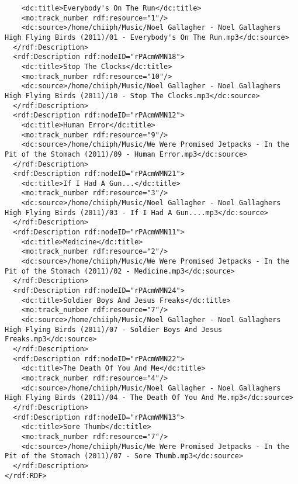 \documentclass[a4paper,oneside]{report}
\begin{document}
\begin{lstlisting}
    <dc:title>Everybody's On The Run</dc:title>
    <mo:track_number rdf:resource="1"/>
    <dc:source>/home/chiiph/Music/Noel Gallagher - Noel Gallaghers High Flying Birds (2011)/01 - Everybody's On The Run.mp3</dc:source>
  </rdf:Description>
  <rdf:Description rdf:nodeID="rPAcmWMN18">
    <dc:title>Stop The Clocks</dc:title>
    <mo:track_number rdf:resource="10"/>
    <dc:source>/home/chiiph/Music/Noel Gallagher - Noel Gallaghers High Flying Birds (2011)/10 - Stop The Clocks.mp3</dc:source>
  </rdf:Description>
  <rdf:Description rdf:nodeID="rPAcmWMN12">
    <dc:title>Human Error</dc:title>
    <mo:track_number rdf:resource="9"/>
    <dc:source>/home/chiiph/Music/We Were Promised Jetpacks - In the Pit of the Stomach (2011)/09 - Human Error.mp3</dc:source>
  </rdf:Description>
  <rdf:Description rdf:nodeID="rPAcmWMN21">
    <dc:title>If I Had A Gun...</dc:title>
    <mo:track_number rdf:resource="3"/>
    <dc:source>/home/chiiph/Music/Noel Gallagher - Noel Gallaghers High Flying Birds (2011)/03 - If I Had A Gun....mp3</dc:source>
  </rdf:Description>
  <rdf:Description rdf:nodeID="rPAcmWMN11">
    <dc:title>Medicine</dc:title>
    <mo:track_number rdf:resource="2"/>
    <dc:source>/home/chiiph/Music/We Were Promised Jetpacks - In the Pit of the Stomach (2011)/02 - Medicine.mp3</dc:source>
  </rdf:Description>
  <rdf:Description rdf:nodeID="rPAcmWMN24">
    <dc:title>Soldier Boys And Jesus Freaks</dc:title>
    <mo:track_number rdf:resource="7"/>
    <dc:source>/home/chiiph/Music/Noel Gallagher - Noel Gallaghers High Flying Birds (2011)/07 - Soldier Boys And Jesus Freaks.mp3</dc:source>
  </rdf:Description>
  <rdf:Description rdf:nodeID="rPAcmWMN22">
    <dc:title>The Death Of You And Me</dc:title>
    <mo:track_number rdf:resource="4"/>
    <dc:source>/home/chiiph/Music/Noel Gallagher - Noel Gallaghers High Flying Birds (2011)/04 - The Death Of You And Me.mp3</dc:source>
  </rdf:Description>
  <rdf:Description rdf:nodeID="rPAcmWMN13">
    <dc:title>Sore Thumb</dc:title>
    <mo:track_number rdf:resource="7"/>
    <dc:source>/home/chiiph/Music/We Were Promised Jetpacks - In the Pit of the Stomach (2011)/07 - Sore Thumb.mp3</dc:source>
  </rdf:Description>
</rdf:RDF>
\end{lstlisting}
\end{document}
